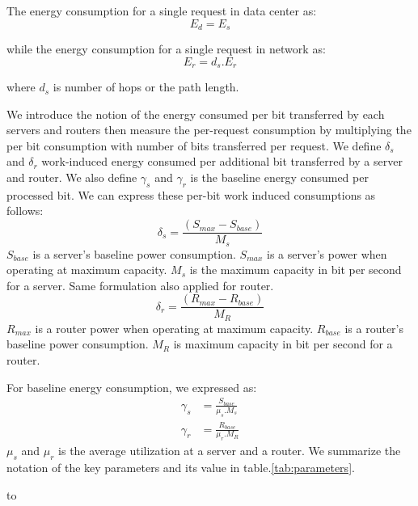 \documentclass[JIP]{ipsj}
\begin{document}
The energy consumption for a single request in data center as:
\begin{equation}\label{eqn:E_d}
	E_{d} = E_s
\end{equation}

while the energy consumption for a single request in network as:
\begin{equation}\label{eqn:E_r}
	E_{r} = d_s.E_r
\end{equation}

where $d_s$ is number of hops or the path length.

We introduce the notion of the energy consumed per bit transferred by each servers and routers then measure the per-request consumption by multiplying the per bit consumption with number of bits transferred per request.  
We define $\delta_s$ and $\delta_r$ work-induced energy consumed per additional bit transferred by a server and router.   
We also define $\gamma_s$ and $\gamma_r$ is the baseline energy consumed per processed bit.  
We can express these per-bit work induced consumptions as follows:
\begin{equation}\label{eqn:delta_s}
	\delta_s = \frac{(S_{max} - S_{base})}{M_s} 
\end{equation}
$S_{base}$ is a server's baseline power consumption.  
$S_{max}$ is a server's power when operating at maximum capacity.
$M_s$ is the maximum capacity in bit per second for a server.
Same formulation also applied for router.  
\begin{equation}\label{eqn:delta_r}
	\delta_r = \frac{(R_{max} - R_{base})}{M_R} 
\end{equation}
$R_{max}$ is a router power when operating at maximum capacity.
$R_{base}$ is a router's baseline power consumption.
$M_R$ is maximum capacity in bit per second for a router.

For baseline energy consumption, we expressed as: 
\begin{equation}\label{eqn:gamma}
\begin{split}
	\gamma_s &= \frac{S_{base}}{\mu_s.M_s} \\
	\gamma_r &= \frac{R_{base}}{\mu_r.M_R}
\end{split}
\end{equation}
$\mu_s$ and $\mu_r$ is the average utilization at a server and a router.
We summarize the notation of the key parameters and its value in table.\ref{tab:parameters}.

\begin{table}[tb]
\caption{Notation of Key Parameters and Its Value from \cite{Nedevschi:2008:HDC:1855610.1855618}.}
\label{tab:parameters}
\hbox to
\end{table}
\end{document}
